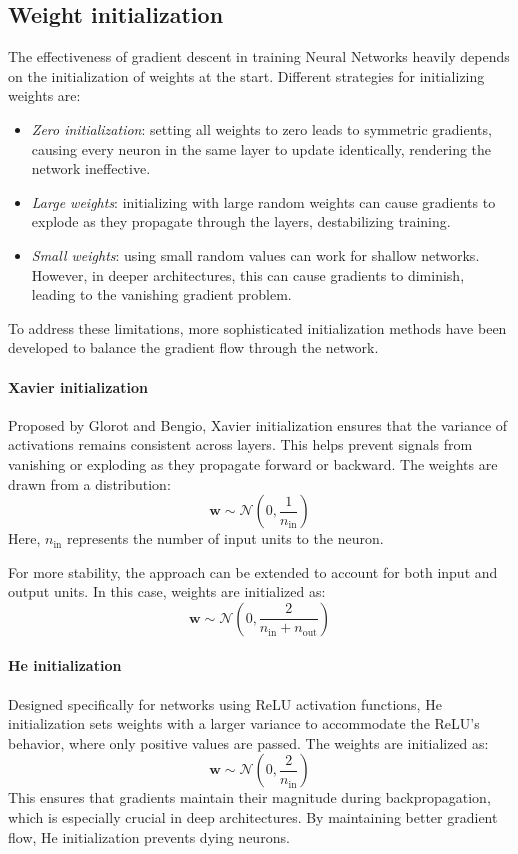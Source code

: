 \subsection{Weight initialization}
The effectiveness of gradient descent in training Neural Networks heavily depends on the initialization of weights at the start. 
Different strategies for initializing weights are:
\begin{itemize}
    \item \textit{Zero initialization}: setting all weights to zero leads to symmetric gradients, causing every neuron in the same layer to update identically, rendering the network ineffective.
    \item \textit{Large weights}: initializing with large random weights can cause gradients to explode as they propagate through the layers, destabilizing training.
    \item \textit{Small weights}: using small random values can work for shallow networks. 
        However, in deeper architectures, this can cause gradients to diminish, leading to the vanishing gradient problem.
\end{itemize}
To address these limitations, more sophisticated initialization methods have been developed to balance the gradient flow through the network.

\paragraph*{Xavier initialization}
Proposed by Glorot and Bengio, Xavier initialization ensures that the variance of activations remains consistent across layers. 
This helps prevent signals from vanishing or exploding as they propagate forward or backward. 
The weights are drawn from a distribution:
\[\mathbf{w}\sim \mathcal{N}\left(0,\frac{1}{n_{\text{in}}}\right)\]
Here, $n_{\text{in}}$ represents the number of input units to the neuron.

For more stability, the approach can be extended to account for both input and output units. 
In this case, weights are initialized as:
\[\mathbf{w}\sim \mathcal{N}\left(0,\frac{2}{n_{\text{in}}+n_{\text{out}}}\right)\]

\paragraph*{He initialization}
Designed specifically for networks using ReLU activation functions, He initialization sets weights with a larger variance to accommodate the ReLU's behavior, where only positive values are passed. 
The weights are initialized as:
\[\mathbf{w}\sim \mathcal{N}\left(0,\frac{2}{n_{\text{in}}}\right)\]
This ensures that gradients maintain their magnitude during backpropagation, which is especially crucial in deep architectures. 
By maintaining better gradient flow, He initialization prevents dying neurons. 